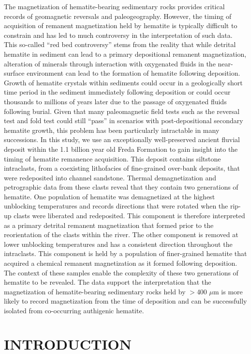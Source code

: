 \documentclass[11pt,letterpaper]{article}
\begin{document}
The magnetization of hematite-bearing sedimentary rocks provides critical records of geomagnetic reversals and paleogeography. However, the timing of acquisition of remanent magnetization held by hematite is typically difficult to constrain and has led to much controversy in the interpretation of such data. This so-called ``red bed controversy'' stems from the reality that while detrital hematite in sediment can lead to a primary depositional remanent magnetization, alteration of minerals through interaction with oxygenated fluids in the near-surface environment can lead to the formation of hematite following deposition. Growth of hematite crystals within sediments could occur in a geologically short time period in the sediment immediately following deposition or could occur thousands to millions of years later due to the passage of oxygenated fluids following burial. Given that many paleomagnetic field tests such as the reversal test and fold test could still ``pass'' in scenarios with post-depositional secondary hematite growth, this problem has been particularly intractable in many successions. In this study, we use an exceptionally well-preserved ancient fluvial deposit within the 1.1 billion year old Freda Formation to gain insight into the timing of hematite remanence acquisition. This deposit contains siltstone intraclasts, from a coexisting lithofacies of fine-grained over-bank deposits, that were redeposited into channel sandstone. Thermal demagnetization and petrographic data from these clasts reveal that they contain two generations of hematite. One population of hematite was demagnetized at the highest unblocking temperatures and records directions that were rotated when the rip-up clasts were liberated and redeposited. This component is therefore interpreted as a primary detrital remanent magnetization that formed prior to the reorientation of the clasts within the river. The other component is removed at lower unblocking temperatures and has a consistent direction throughout the intraclasts. This component is held by a population of finer-grained hematite that acquired a chemical remanent magnetization as it formed following deposition. The context of these samples enable the complexity of these two generations of hematite to be revealed. The data support the interpretation that the magnetization of hematite-bearing sedimentary rocks held by $>$400 $\mu$m is more likely to record magnetization from the time of deposition and can be successfully isolated from co-occurring authigenic hematite.

\section*{INTRODUCTION}
\end{document}
